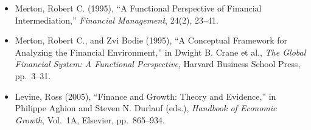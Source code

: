 
\begin{itemize}

\item Merton, Robert C. (1995),
``A Functional Perspective of Financial Intermediation,''
\emph{Financial Management}, 24(2), 23--41.

\item Merton, Robert C., and Zvi Bodie (1995),
``A Conceptual Framework for Analyzing the Financial Environment,''
in Dwight B. Crane et al., \emph{The Global Financial System:
A Functional Perspective}, Harvard Business School Press, pp.~3--31.

\item Levine, Ross (2005),
``Finance and Growth: Theory and Evidence,''
in Philippe Aghion and Steven N. Durlauf (eds.),
\emph{Handbook of Economic Growth}, Vol.~1A,
Elsevier, pp.~865--934.

\end{itemize}

